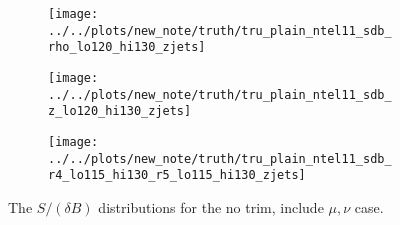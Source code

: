 \begin{figure}[!htbp]\captionsetup{justification=centering}
\begin{center}
\begin{subfigure}[t]{18pc}\centering\texttt{[image: ../../plots/new\_note/truth/tru\_plain\_ntel11\_sdb\_rho\_lo120\_hi130\_zjets]}\caption{}\end{subfigure}
\begin{subfigure}[t]{18pc}\centering\texttt{[image: ../../plots/new\_note/truth/tru\_plain\_ntel11\_sdb\_z\_lo120\_hi130\_zjets]}\caption{}\end{subfigure}
\begin{subfigure}[t]{18pc}\centering\texttt{[image: ../../plots/new\_note/truth/tru\_plain\_ntel11\_sdb\_r4\_lo115\_hi130\_r5\_lo115\_hi130\_zjets]}\caption{}\end{subfigure}
\caption{\label{fig:mbbplain}The $S/(\delta B)$ distributions for the no trim, include $\mu,\nu$ case.}
\end{center}
\end{figure}

